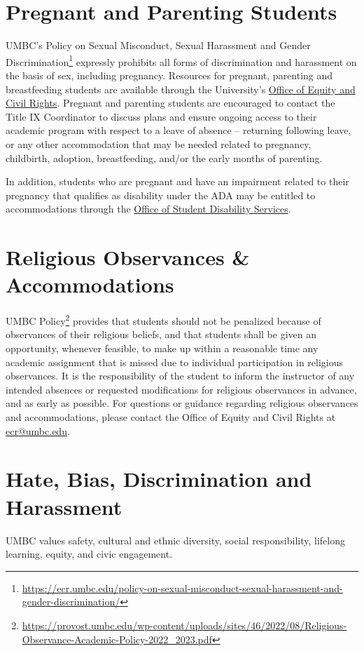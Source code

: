 \documentclass[letter,10pt]{article}
\begin{document}
\section*{Pregnant and Parenting Students}
UMBC’s Policy on Sexual Misconduct, Sexual Harassment and Gender Discrimination\footnote{\url{https://ecr.umbc.edu/policy-on-sexual-misconduct-sexual-harassment-and-gender-discrimination/}} expressly prohibits all forms of discrimination and harassment on the basis of sex, including pregnancy. Resources for pregnant, parenting and breastfeeding students are available through the University’s \href{https://ecr.umbc.edu/students/}{Office of Equity and Civil Rights}.  Pregnant and parenting students are encouraged to contact the Title IX Coordinator to discuss plans and ensure ongoing access to their academic program with respect to a leave of absence – returning following leave, or any other accommodation that may be needed related to pregnancy, childbirth, adoption, breastfeeding, and/or the early months of parenting.

In addition, students who are pregnant and have an impairment related to their pregnancy that qualifies as disability under the ADA may be entitled to accommodations through the \href{https://sds.umbc.edu/accommodations/registering-with-sds/}{Office of Student Disability Services}.

\section*{Religious Observances \& Accommodations}
UMBC Policy\footnote{\url{https://provost.umbc.edu/wp-content/uploads/sites/46/2022/08/Religious-Observance-Academic-Policy-2022_2023.pdf}} provides that students should not be penalized because of observances of their religious beliefs, and that students shall be given an opportunity, whenever feasible, to make up within a reasonable time any academic assignment that is missed due to individual participation in religious observances. It is the responsibility of the student to inform the instructor of any intended absences or requested modifications for religious observances in advance, and as early as possible. For questions or guidance regarding religious observances and accommodations, please contact the Office of Equity and Civil Rights at \href{mailto:ecr@umbc.edu}{ecr@umbc.edu}.

\section*{Hate, Bias, Discrimination and Harassment}
UMBC values safety, cultural and ethnic diversity, social responsibility, lifelong learning, equity, and civic engagement.
\end{document}
